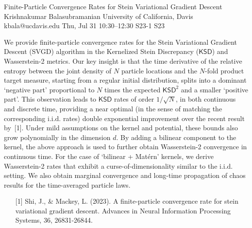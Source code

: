 \begin{talk}
  {Finite-Particle Convergence Rates for Stein Variational Gradient Descent}%
  {Krishnakumar Balasubramanian}%
  {University of California, Davis}%
  {kbala@ucdavis.edu}%
  {}%
  {}%
  {Thu, Jul 31 10:30–12:30}%
  {S23-1}%
  {S23}%
  {}%
  
				
			
 We provide finite-particle convergence rates for the Stein Variational Gradient Descent (SVGD) algorithm in the Kernelized Stein Discrepancy ($\mathsf{KSD}$) and Wasserstein-2 metrics. Our key insight is that the time derivative of the relative entropy between the joint density of $N$ particle locations and the $N$-fold product target measure, starting from a regular initial distribution, splits into a dominant `negative part' proportional to $N$ times the expected $\mathsf{KSD}^2$ and a smaller `positive part'. This observation leads to $\mathsf{KSD}$ rates of order $1/\sqrt{N}$, in both continuous and discrete time, providing a near optimal (in the sense of matching the corresponding i.i.d. rates) double exponential improvement over the recent result by~[1]. Under mild assumptions on the kernel and potential, these bounds also grow polynomially in the dimension $d$. By adding a bilinear component to the kernel, the above approach is used to further obtain Wasserstein-2 convergence in continuous time. For the case of `bilinear + Mat\'ern' kernels, we derive Wasserstein-2 rates that exhibit a curse-of-dimensionality similar to the i.i.d. setting. We also obtain marginal convergence and long-time propagation of chaos results for the time-averaged particle laws. 

\medskip


\begin{enumerate}
	\item[{[1]}] Shi, J., \& Mackey, L. (2023). A finite-particle convergence rate for stein variational gradient descent. Advances in Neural Information Processing Systems, 36, 26831-26844.
\end{enumerate}

\end{talk}

